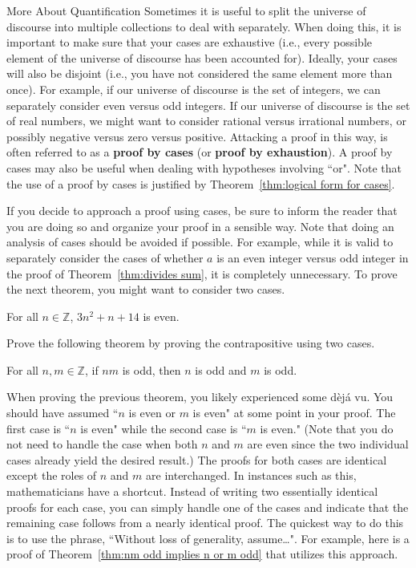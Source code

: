\begin{section}{More About Quantification}
Sometimes it is useful to split the universe of discourse into multiple collections to deal with separately.  When doing this, it is important to make sure that your cases are exhaustive (i.e., every possible element of the universe of discourse has been accounted for).  Ideally, your cases will also be disjoint (i.e., you have not considered the same element more than once).  For example, if our universe of discourse is the set of integers, we can separately consider even versus odd integers. If our universe of discourse is the set of real numbers, we might want to consider rational versus irrational numbers, or possibly negative versus zero versus positive. Attacking a proof in this way, is often referred to as a \textbf{proof by cases} (or \textbf{proof by exhaustion}). A proof by cases may also be useful when dealing with hypotheses involving ``or".  Note that the use of a proof by cases is justified by Theorem~\ref{thm:logical form for cases}.

If you decide to approach a proof using cases, be sure to inform the reader that you are doing so and organize your proof in a sensible way. Note that doing an analysis of cases should be avoided if possible. For example, while it is valid to separately consider the cases of whether $a$ is an even integer versus odd integer in the proof of Theorem~\ref{thm:divides sum}, it is completely unnecessary.  To prove the next theorem, you might want to consider two cases.

\begin{theorem}\label{thm:3n^2+n+14 is even}
For all $n\in \mathbb{Z}$, $3n^2+n+14$ is even.
\end{theorem}

Prove the following theorem by proving the contrapositive using two cases.

\begin{theorem}\label{thm:nm odd implies n or m odd} %
For all $n,m\in\mathbb{Z}$, if $nm$ is odd, then $n$ is odd and $m$ is odd.
\end{theorem}

When proving the previous theorem, you likely experienced some d\`ej\'a vu. You should have assumed ``$n$ is even or $m$ is even" at some point in your proof. The first case is ``$n$ is even" while the second case is ``$m$ is even."  (Note that you do not need to handle the case when both $n$ and $m$ are even since the two individual cases already yield the desired result.) The proofs for both cases are identical except the roles of $n$ and $m$ are interchanged.  In instances such as this, mathematicians have a shortcut. Instead of writing two essentially identical proofs for each case, you can simply handle one of the cases and indicate that the remaining case follows from a nearly identical proof.  The quickest way to do this is to use the phrase, ``Without loss of generality, assume\ldots".  For example, here is a proof of Theorem~\ref{thm:nm odd implies n or m odd} that utilizes this approach.\\


\end{section}
